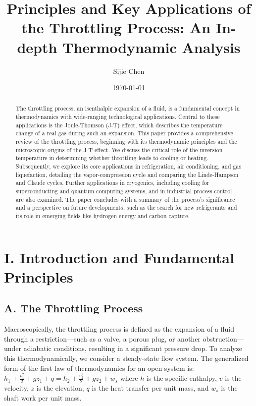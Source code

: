 \documentclass[aps,prl,reprint,groupedaddress]{revtex4-2}
\begin{document}

\title{Principles and Key Applications of the Throttling Process: An In-depth Thermodynamic Analysis}

\author{Sijie Chen     }

\date{\today}

\begin{abstract}
The throttling process, an isenthalpic expansion of a fluid, is a fundamental concept in thermodynamics with wide-ranging technological applications. Central to these applications is the Joule-Thomson (J-T) effect, which describes the temperature change of a real gas during such an expansion. This paper provides a comprehensive review of the throttling process, beginning with its thermodynamic principles and the microscopic origins of the J-T effect. We discuss the critical role of the inversion temperature in determining whether throttling leads to cooling or heating. Subsequently, we explore its core applications in refrigeration, air conditioning, and gas liquefaction, detailing the vapor-compression cycle and comparing the Linde-Hampson and Claude cycles. Further applications in cryogenics, including cooling for superconducting and quantum computing systems, and in industrial process control are also examined. The paper concludes with a summary of the process's significance and a perspective on future developments, such as the search for new refrigerants and its role in emerging fields like hydrogen energy and carbon capture.
\end{abstract}

\maketitle

\section{I. Introduction and Fundamental Principles}

\subsection{A. The Throttling Process}
Macroscopically, the throttling process is defined as the expansion of a fluid through a restriction—such as a valve, a porous plug, or another obstruction—under adiabatic conditions, resulting in a significant pressure drop. To analyze this thermodynamically, we consider a steady-state flow system. The generalized form of the first law of thermodynamics for an open system is:
$h_1 + \frac{v_1^2}{2} + gz_1 + q = h_2 + \frac{v_2^2}{2} + gz_2 + w_s$
where $h$ is the specific enthalpy, $v$ is the velocity, $z$ is the elevation, $q$ is the heat transfer per unit mass, and $w_s$ is the shaft work per unit mass.
\end{document}
